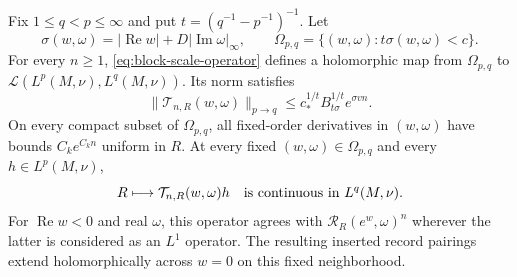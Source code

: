 \begin{theorem}
\label{thm:common-scale-holomorphy}
Fix $1\le q<p\le\infty$ and put $t=(q^{-1}-p^{-1})^{-1}$. Let
\[
 \sigma(w,\omega)=|\operatorname{Re}w|+D|\operatorname{Im}\omega|_\infty,
 \qquad \Omega_{p,q}=\{(w,\omega):t\sigma(w,\omega)<c\}.
\]
For every $n\ge1$, \eqref{eq:block-scale-operator} defines a
holomorphic map from $\Omega_{p,q}$ to
$\mathcal L(L^p(M,\nu),L^q(M,\nu))$. Its norm satisfies
\begin{equation}\label{eq:scale-operator-bound}
 \|\mathcal T_{n,R}(w,\omega)\|_{p\to q}
       \le c_*^{1/t}B_{t\sigma}^{1/t}e^{\sigma vn}.
\end{equation}
On every compact subset of $\Omega_{p,q}$, all fixed-order derivatives in $(w,\omega)$ have bounds $C_k e^{C_k n}$ uniform in $R$. At every fixed
$(w,\omega)\in\Omega_{p,q}$ and every $h\in L^p(M,\nu)$,
\begin{equation}\label{eq:scale-parameter-continuity}
 R\longmapsto\mathcal T_{n,R}(w,\omega)h
       \quad\hbox{is continuous in }L^q(M,\nu).
\end{equation}
For $\operatorname{Re}w<0$ and real $\omega$, this operator agrees
with $\mathcal R_R(e^w,\omega)^n$ wherever the latter is considered
as an $L^1$ operator. The resulting inserted record pairings extend
holomorphically across $w=0$ on this fixed neighborhood.
\end{theorem}
